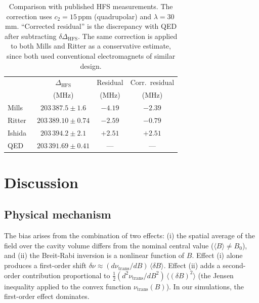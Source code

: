 \documentclass[twocolumn,pra,aps,superscriptaddress,floatfix,10pt]{revtex4-2}
\begin{document}
\begin{table}[t]
\caption{Comparison with published HFS measurements. The correction uses $c_2 = 15$\,ppm (quadrupolar) and $\lambda = 30$\,mm. ``Corrected residual'' is the discrepancy with QED after subtracting $\delta\Delta_\mathrm{HFS}$. The same correction is applied to both Mills and Ritter as a conservative estimate, since both used conventional electromagnets of similar design.}
\label{tab:comparison}
\begin{ruledtabular}
\begin{tabular}{lccc}
 & $\Delta_\mathrm{HFS}$ & Residual & Corr.\ residual \\
 & (MHz) & (MHz) & (MHz) \\
\hline
Mills~\cite{Mills1983}  & $203\,387.5 \pm 1.6$ & $-4.19$ & $-2.39$ \\
Ritter~\cite{Ritter1984} & $203\,389.10 \pm 0.74$ & $-2.59$ & $-0.79$ \\
Ishida~\cite{Ishida2014} & $203\,394.2 \pm 2.1$ & $+2.51$ & $+2.51$ \\
QED~\cite{Kniehl2000,Baker2014} & $203\,391.69 \pm 0.41$ & --- & --- \\
\end{tabular}
\end{ruledtabular}
\end{table}

\section{Discussion}
\label{sec:discussion}

\subsection{Physical mechanism}

The bias arises from the combination of two effects: (i) the spatial average of the field over the cavity volume differs from the nominal central value ($\langle B \rangle \neq B_0$), and (ii) the Breit-Rabi inversion is a nonlinear function of $B$. Effect (i) alone produces a first-order shift $\delta\nu \approx (d\nu_\mathrm{trans}/dB)\,\langle\delta B\rangle$. Effect (ii) adds a second-order contribution proportional to $\tfrac{1}{2}(d^2\nu_\mathrm{trans}/dB^2)\,\langle(\delta B)^2\rangle$ (the Jensen inequality applied to the convex function $\nu_\mathrm{trans}(B)$). In our simulations, the first-order effect dominates.
\end{document}
